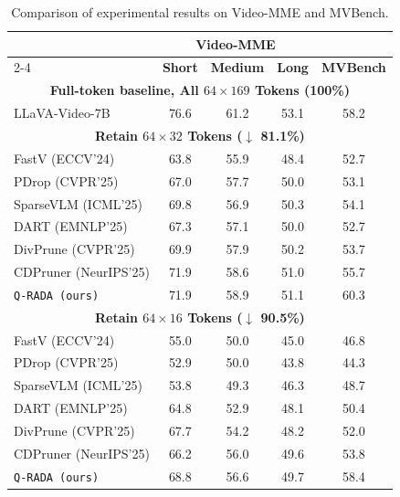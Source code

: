 \begin{table}
\centering
\small
\caption{Comparison of experimental results on Video-MME and MVBench.}
\label{tab:experiment}

\renewcommand{\arraystretch}{1.08}
\begin{tabular}{@{}l|ccc|c@{}}
\toprule

& \multicolumn{3}{c}{\textbf{Video-MME}} & \\
\cmidrule(lr){2-4}
\multicolumn{1}{c}{\textbf{Method}}
& \textbf{Short}
& \textbf{Medium}
& \textbf{Long}
& \textbf{MVBench} \\

\midrule
\multicolumn{5}{c}{
  \textbf{Full-token baseline, All $64 \times 169$ Tokens (100\%)}
} \\
\midrule

LLaVA-Video-7B
& 76.6 & 61.2 & 53.1 & 58.2 \\

\midrule
\multicolumn{5}{c}{
  \textbf{Retain $64 \times 32$ Tokens ($\downarrow$ 81.1\%)}
} \\
\midrule

FastV (ECCV'24)     & 63.8 & 55.9 & 48.4 & 52.7 \\
PDrop (CVPR'25)     & 67.0 & 57.7 & 50.0 & 53.1 \\
SparseVLM (ICML'25)  & 69.8 & 56.9 & 50.3 & 54.1 \\
DART (EMNLP'25)      & 67.3 & 57.1 & 50.0 & 52.7 \\
DivPrune (CVPR'25)  & 69.9 & 57.9 & 50.2 & 53.7 \\
CDPruner (NeurIPS'25)  & 71.9 & 58.6 & 51.0 & 55.7 \\
\rowcolor{gray!20}\texttt{Q-RADA (ours)}  & 71.9 & 58.9 & 51.1 & 60.3 \\

\midrule
\multicolumn{5}{c}{
  \textbf{Retain $64 \times 16$ Tokens ($\downarrow$ 90.5\%)}
} \\
\midrule

FastV (ECCV'24)     & 55.0 & 50.0 & 45.0 & 46.8 \\
PDrop (CVPR'25)     & 52.9 & 50.0 & 43.8 & 44.3 \\
SparseVLM (ICML'25)  & 53.8 & 49.3 & 46.3 & 48.7 \\
DART (EMNLP'25)      & 64.8 & 52.9 & 48.1 & 50.4 \\
DivPrune (CVPR'25)  & 67.7 & 54.2 & 48.2 & 52.0 \\
CDPruner (NeurIPS'25)  & 66.2 & 56.0 & 49.6 & 53.8 \\
\rowcolor{gray!20}\texttt{Q-RADA (ours)}   & 68.8 & 56.6 & 49.7 & 58.4 \\

\bottomrule
\end{tabular}
\vspace{-2em}
\end{table}
